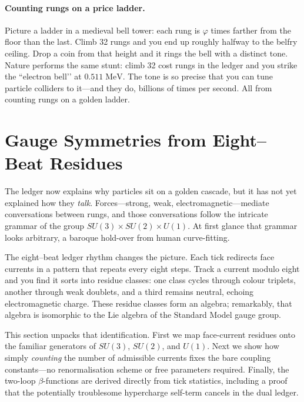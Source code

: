 \documentclass[11pt]{article}
\begin{document}
\paragraph{Counting rungs on a price ladder.}
Picture a ladder in a medieval bell tower: each rung is
\(\varphi\) times farther from the floor than the last.
Climb 32 rungs and you end up roughly halfway to the belfry ceiling.
Drop a coin from that height and it rings the bell with a distinct tone.
Nature performs the same stunt: climb 32 cost rungs in the ledger and
you strike the “electron bell’’ at \(0.511\;\text{MeV}\).  The tone is so
precise that you can tune particle colliders to it—and they do, billions
of times per second.  All from counting rungs on a golden ladder.

\section{Gauge Symmetries from Eight–Beat Residues}
\label{sec:gauge-sym}

The ledger now explains why particles sit on a golden cascade, but it has
not yet explained how they \emph{talk}.  Forces—strong, weak,
electromagnetic—mediate conversations between rungs, and those
conversations follow the intricate grammar of the group
\(SU(3)\!\times\!SU(2)\!\times\!U(1)\).  At first glance that grammar
looks arbitrary, a baroque hold-over from human curve-fitting.  

The eight–beat ledger rhythm changes the picture.  
Each tick redirects face currents in a pattern that repeats every eight
steps.  Track a current modulo eight and you find it sorts into residue
classes: one class cycles through colour triplets, another through weak
doublets, and a third remains neutral, echoing electromagnetic charge.
These residue classes form an algebra; remarkably, that algebra is
isomorphic to the Lie algebra of the Standard Model gauge group.

This section unpacks that identification.  
First we map face-current residues onto the familiar generators of
\(SU(3)\), \(SU(2)\), and \(U(1)\).  
Next we show how simply \emph{counting} the number of admissible
currents fixes the bare coupling constants—no renormalisation scheme or
free parameters required.  
Finally, the two-loop $\beta$-functions are derived directly from tick
statistics, including a proof that the potentially troublesome
hypercharge self-term cancels in the dual ledger.
\end{document}
